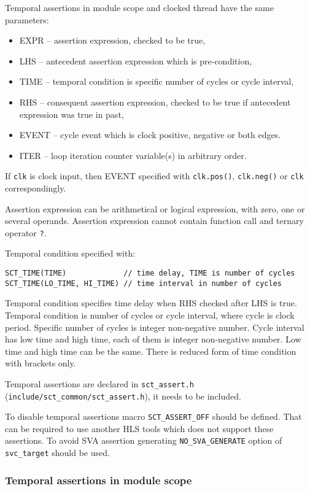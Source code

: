 Temporal assertions in module scope and clocked thread have the same parameters:
\begin{itemize}
\item EXPR -- assertion expression, checked to be true,
\item LHS -- antecedent assertion expression which is pre-condition, 
\item TIME -- temporal condition is specific number of cycles or cycle interval,
\item RHS -- consequent assertion expression, checked to be true if antecedent expression was true in past,
\item EVENT -- cycle event which is clock positive, negative or both edges.
\item ITER -- loop iteration counter variable(s) in arbitrary order.
\end{itemize}

If {\tt clk} is clock input, then EVENT specified with {\tt clk.pos()}, {\tt clk.neg()} or {\tt clk} correspondingly. 

Assertion expression can be arithmetical or logical expression, with zero, one or several operands. Assertion expression cannot contain function call and ternary operator {\tt ?}.

Temporal condition specified with:
\begin{lstlisting}[style=mycpp]
SCT_TIME(TIME)             // time delay, TIME is number of cycles
SCT_TIME(LO_TIME, HI_TIME) // time interval in number of cycles
\end{lstlisting}

Temporal condition specifies time delay when RHS checked after LHS is true. Temporal condition is number of cycles or cycle interval, where cycle is clock period. Specific number of cycles is integer non-negative number. Cycle interval has low time and high time, each of them is integer non-negative number. Low time and high time can be the same. There is reduced form of time condition with brackets only.

Temporal assertions are declared in {\tt sct\_assert.h} ({\tt include/sct\_common/sct\_assert.h}), it needs to be included. 

To disable temporal assertions macro {\tt SCT\_ASSERT\_OFF} should be defined. That can be required to use another HLS tools which does not support these assertions.
To avoid SVA assertion generating {\tt NO\_SVA\_GENERATE} option of {\tt svc\_target} should be used. 

\subsubsection{Temporal assertions in module scope}

